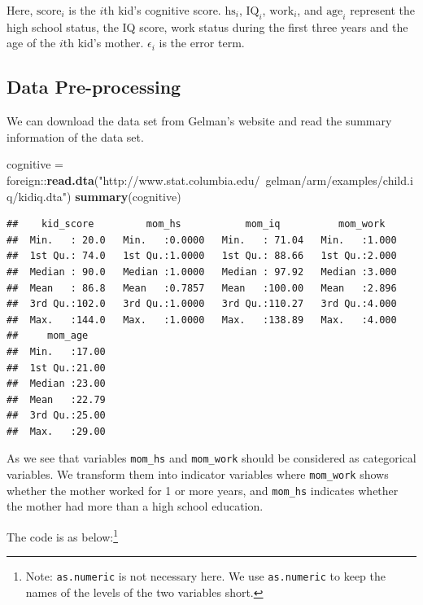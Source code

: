 \documentclass[]{book}
\newenvironment{Shaded}{\begin{snugshade}}{\end{snugshade}}
\newcommand{\KeywordTok}[1]{\textcolor[rgb]{0.13,0.29,0.53}{\textbf{{#1}}}}
\newcommand{\StringTok}[1]{\textcolor[rgb]{0.31,0.60,0.02}{{#1}}}
\newcommand{\NormalTok}[1]{{#1}}
\let\rmarkdownfootnote\footnote%
\def\footnote{\protect\rmarkdownfootnote}
\theoremstyle{definition}
\theoremstyle{definition}
\theoremstyle{definition}
\theoremstyle{remark}
\begin{document}
Here, \(\text{score}_i\) is the \(i\)th kid's cognitive score.
\(\text{hs}_i\), \(\text{IQ}_i\), \(\text{work}_i\), and
\(\text{age}_i\) represent the high school status, the IQ score, work
status during the first three years and the age of the \(i\)th kid's
mother. \(\epsilon_i\) is the error term.

\subsection{Data Pre-processing}\label{data-pre-processing}

We can download the data set from Gelman's website and read the summary
information of the data set.

\begin{Shaded}
\begin{Highlighting}[]
\NormalTok{cognitive =}\StringTok{ }\NormalTok{foreign::}\KeywordTok{read.dta}\NormalTok{(}\StringTok{"http://www.stat.columbia.edu/~gelman/arm/examples/child.iq/kidiq.dta"}\NormalTok{)}
\KeywordTok{summary}\NormalTok{(cognitive)}
\end{Highlighting}
\end{Shaded}

\begin{verbatim}
##    kid_score         mom_hs           mom_iq          mom_work    
##  Min.   : 20.0   Min.   :0.0000   Min.   : 71.04   Min.   :1.000  
##  1st Qu.: 74.0   1st Qu.:1.0000   1st Qu.: 88.66   1st Qu.:2.000  
##  Median : 90.0   Median :1.0000   Median : 97.92   Median :3.000  
##  Mean   : 86.8   Mean   :0.7857   Mean   :100.00   Mean   :2.896  
##  3rd Qu.:102.0   3rd Qu.:1.0000   3rd Qu.:110.27   3rd Qu.:4.000  
##  Max.   :144.0   Max.   :1.0000   Max.   :138.89   Max.   :4.000  
##     mom_age     
##  Min.   :17.00  
##  1st Qu.:21.00  
##  Median :23.00  
##  Mean   :22.79  
##  3rd Qu.:25.00  
##  Max.   :29.00
\end{verbatim}

As we see that variables \texttt{mom\_hs} and \texttt{mom\_work} should
be considered as categorical variables. We transform them into indicator
variables where \texttt{mom\_work} shows whether the mother worked for 1
or more years, and \texttt{mom\_hs} indicates whether the mother had
more than a high school education.

The code is as below:\footnote{Note: \texttt{as.numeric} is not
  necessary here. We use \texttt{as.numeric} to keep the names of the
  levels of the two variables short.}
\end{document}
